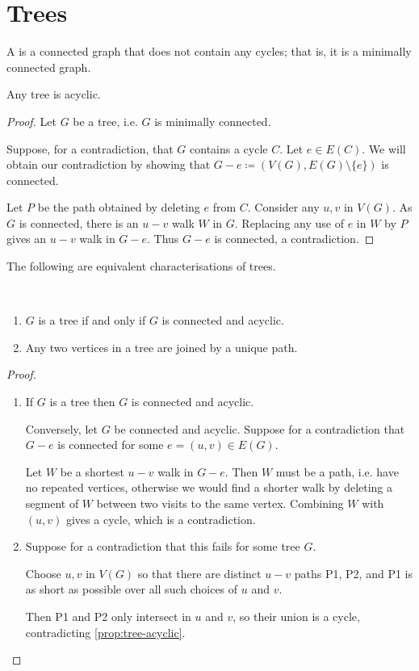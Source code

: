 \section{Trees}
\begin{definition}[Tree]
A  is a connected graph that does not contain any cycles; that is, it is a minimally connected graph.
\end{definition}

\begin{proposition}\label{prop:tree-acyclic}
Any tree is acyclic.
\end{proposition}

\begin{proof}
Let $G$ be a tree, i.e. $G$ is minimally connected.

Suppose, for a contradiction, that $G$ contains a cycle $C$. Let $e \in E(C)$. We will obtain our contradiction by showing that $G-e \coloneqq (V(G),E(G)\setminus\{e\})$ is connected. 

Let $P$ be the path obtained by deleting $e$ from $C$. Consider any $u,v$ in $V(G)$. As $G$ is connected, there is an $u-v$ walk $W$ in $G$. Replacing any use of $e$ in $W$ by $P$ gives an $u-v$ walk in $G-e$. Thus $G-e$ is connected, a contradiction.
\end{proof}

The following are equivalent characterisations of trees.
\begin{lemma}\label{lemma:tree-char} \
\begin{enumerate}[label=(\roman*)]
\item $G$ is a tree if and only if $G$ is connected and acyclic.
\item Any two vertices in a tree are joined by a unique path.
\end{enumerate}
\end{lemma}

\begin{proof} \
\begin{enumerate}[label=(\roman*)]
\item If $G$ is a tree then $G$ is connected and acyclic.

Conversely, let $G$ be connected and acyclic. Suppose for a contradiction that $G-e$ is connected for some $e = (u,v) \in E(G)$.

Let $W$ be a shortest $u-v$ walk in $G-e$. Then $W$ must be a path, i.e. have no repeated vertices, otherwise we would find a shorter walk by deleting a segment of $W$ between two visits to the same vertex. Combining $W$ with $(u,v)$ gives a cycle, which is a contradiction.

\item Suppose for a contradiction that this fails for some tree $G$. 

Choose $u,v$ in $V(G)$ so that there are distinct $u-v$ paths P1, P2, and P1 is as short as possible over all such choices of $u$ and $v$.

Then P1 and P2 only intersect in $u$ and $v$, so their union is a cycle, contradicting \cref{prop:tree-acyclic}.
\end{enumerate}
\end{proof}


